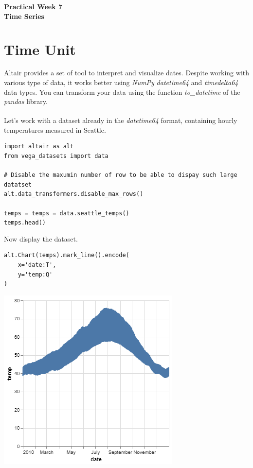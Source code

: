 \documentclass[11pt]{article}
\begin{document}
\pagestyle{fancy}
\renewcommand{\headrulewidth}{0pt}
\fancyfoot[L]{\thepage}
\fancyfoot[C]{}

\begin{center}
\vspace*{1cm}
{\textbf {\Huge Practical Week 7}}\\
\vspace*{0.5cm}
{\textbf {\huge Time Series}}
\vspace*{1cm}
\end{center}

\section{Time Unit}

Altair provides a set of tool to interpret and visualize dates. Despite working with various type of data, it works better using \textit{NumPy} \textit{datetime64} and \textit{timedelta64} data types. You can transform your data using the function \textit{to\_datetime} of the \textit{pandas} library.\\
\\
Let's work with a dataset already in the \textit{datetime64} format, containing hourly temperatures measured in Seattle.

\begin{verbatim}
import altair as alt
from vega_datasets import data

# Disable the maxumin number of row to be able to dispay such large datatset
alt.data_transformers.disable_max_rows()

temps = temps = data.seattle_temps()
temps.head()
\end{verbatim}

Now display the dataset.

\begin{verbatim}
alt.Chart(temps).mark_line().encode(
    x='date:T',
    y='temp:Q'
)
\end{verbatim}

\begin{center}
\includegraphics[width=.5\textwidth]{visualization (1).png}
\end{center}
\end{document}
